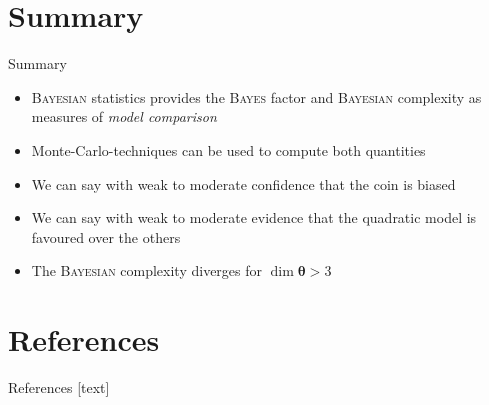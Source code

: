 \documentclass[11pt,aspectratio=1610,dvipsnames]{beamer}
\newcommand{\btheta}{\boldsymbol{\theta}}
\begin{document}
\section{Summary}
\begin{frame}{Summary}
	\begin{minipage}{0.48\linewidth}
			\begin{tcolorbox}[colback=blue!5,colframe=gray!15!black,title=Theory and methods, width=\linewidth]
			\begin{itemize}
				\item \textsc{Bayesian} statistics provides the \textsc{Bayes} factor and \textsc{Bayesian} complexity as measures of \emph{model comparison}
				\item Monte-Carlo-techniques can be used to compute both quantities
				\vspace{0.5cm}
			\end{itemize}
		\end{tcolorbox}
	\end{minipage}
\begin{minipage}{0.48\linewidth}
	\begin{tcolorbox}[colback=green!5,colframe=gray!15!black,title=Exampless, width=\linewidth]
		\begin{itemize}
			\item We can say with weak to moderate confidence that the coin is biased
			\item We can say with weak to moderate evidence that the quadratic model is favoured over the others
			\item The \textsc{Bayesian} complexity diverges for $\dim{\btheta}>3$ 
		\end{itemize}
	\end{tcolorbox}
\end{minipage}
\end{frame}

\section*{References}
\begin{frame}[allowframebreaks]{References}
	[text]

	\printbibliography
\end{frame}
\end{document}
